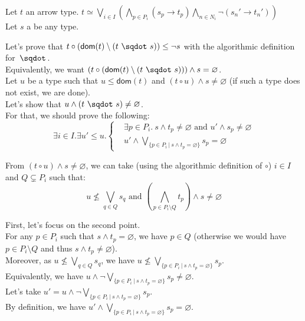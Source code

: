 \documentclass[a4paper]{article}%
\newcommand{\worra}[2]{#1\mathop{\,\sqdot\,} #2}
\newcommand{\apply}[2]{#1\circ#2}
\newcommand{\dom}[1]{\textsf{dom}(#1)}
\newcommand{\alt}{~|~}
\newcommand{\Empty} {\textsf{Empty}}%
\newcommand{\Any} {\textsf{Any}}%
\begin{document}
    Let $t$ an arrow type. $t \simeq \bigvee_{i\in I}\left(\bigwedge_{p\in P_i}(s_p\to t_p)\bigwedge_{n\in N_i}\neg(s_n'\to t_n')\right)$\\
    Let $s$ a be any type.

    Let's prove that $\apply t {(\dom t \setminus (\worra t s))} \leq \neg s$ with the algorithmic definition for $\worra {} {}$.\\
    Equivalently, we want $(\apply t {(\dom t \setminus (\worra t s))}) \land s = \varnothing$.\\

    Let $u$ be a type such that $u \leq \dom t$ and $(\apply t u) \land s \neq \varnothing$ (if such a type does not exist, we are done).\\
    Let's show that $u \land (\worra t s) \neq \varnothing$.\\
    For that, we should prove the following:\\
    \[ \exists i \in I. \exists u' \leq u. \left\{\begin{aligned}
        &\exists p \in P_i.\ s \land t_p \neq \varnothing \text{ and } u' \land s_p \neq \varnothing \\
        &u' \land \bigvee_{\{p \in P_i \alt s \land t_p = \varnothing\}}s_p = \varnothing
    \end{aligned} \right. \]

    From $(\apply t u) \land s \neq \varnothing$, we can take (using the algorithmic definition of $\circ$) $i \in I$ and $Q \subsetneq P_i$ such that:\\
    \[ u \not\leq\bigvee_{q\in Q}s_q \text{ and } (\bigwedge_{p\in P_i\setminus Q}t_p) \land s \neq \varnothing \]

    First, let's focus on the second point.\\
    For any $p \in P_i$ such that $s \land t_p = \varnothing$, we have $p \in Q$ (otherwise we would have $p \in P_i \setminus Q$ and thus $s \land t_p \neq \varnothing$).\\
    Moreover, as $u \not\leq\bigvee_{q\in Q}s_q$, we have $u \not\leq\bigvee_{\{p \in P_i \alt s \land t_p = \varnothing\}}s_p$.\\
    Equivalently, we have $u \land \neg \bigvee_{\{p \in P_i \alt s \land t_p = \varnothing\}}s_p \neq \varnothing$.\\
    Let's take $u' = u \land \neg \bigvee_{\{p \in P_i \alt s \land t_p = \varnothing\}}s_p$.\\
    By definition, we have $u' \land \bigvee_{\{p \in P_i \alt s \land t_p = \varnothing\}}s_p = \varnothing$.\\
\end{document}
